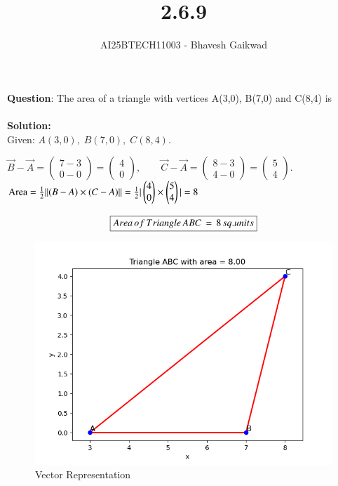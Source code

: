 \documentclass[journal]{IEEEtran}
\begin{document}

\vspace{3cm}

\title{2.6.9}
\author{AI25BTECH11003 - Bhavesh Gaikwad}
{\let\newpage\relax\maketitle}

\renewcommand{\thefigure}{\theenumi}
\renewcommand{\thetable}{\theenumi}
\setlength{\intextsep}{10pt} 


\renewcommand{\thetable}{\theenumi}


\textbf{Question}: The area of a triangle with vertices A(3,0), B(7,0) and C(8,4) is\\\\

\textbf{Solution:}\\

Given: $A(3,0),\; B(7,0),\; C(8,4).$

$
\vec{B}-\vec{A}=\begin{pmatrix}7-3\\0-0\end{pmatrix}
=\begin{pmatrix}4\\0\end{pmatrix},\qquad
\vec{C}-\vec{A}=\begin{pmatrix}8-3\\4-0\end{pmatrix}
=\begin{pmatrix}5\\4\end{pmatrix}.
$\\

$
\text{Area}=\frac{1}{2}||(B-A) \times (C-A)|| = \frac{1}{2} |\begin{pmatrix}4 \\ 0\end{pmatrix} \times \begin{pmatrix}5 \\ 4\end{pmatrix}| = 8$

\begin{align}
    \centering
    \boxed{Area \, of \, Triangle \, ABC \,= \,8\,sq.units}
\end{align}
\bigskip

\begin{figure}[htbp]
    \centering
    \includegraphics[width=0.8\linewidth]{figs/fig1.png}
    \caption{Vector Representation}
    \label{fig:fig/fig1.png}
\end{figure}
\end{document}
